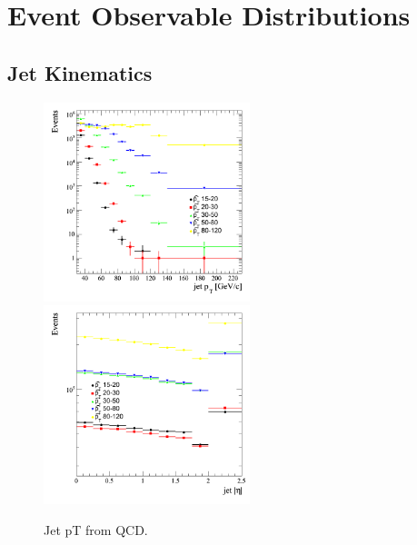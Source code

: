 \section{Event Observable Distributions}


\subsection{Jet Kinematics}
\begin{figure}[htbp]
  \begin{center}
    \includegraphics[width=60mm]{Figures/jet_ptqcdbinned.png}
    \includegraphics[width=60mm]{Figures/jet_eta_qcdbinned.png}
  \end{center}
  \caption{Jet pT from QCD.}
  \label{fig:jet_pt_QCD}
\end{figure}

